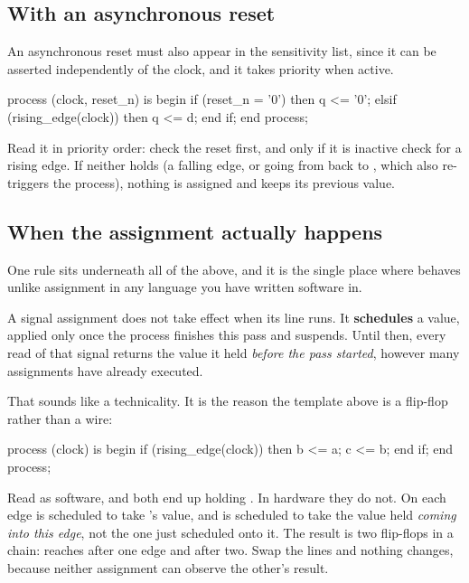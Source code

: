 \subsection{With an asynchronous reset}
\label{c3:asyncreset}
An asynchronous reset must also appear in the sensitivity list, since it can be asserted
independently of the clock, and it takes priority when active.

\begin{vhdlcode}
process (clock, reset_n) is
begin
    if (reset_n = '0') then
        q <= '0';
    elsif (rising_edge(clock)) then
        q <= d;
    end if;
end process;
\end{vhdlcode}

\noindent Read it in priority order: check the reset first, and only if it is inactive check for a
rising edge. If neither holds (a falling edge, or  going from  back to
, which also re-triggers the process), nothing is assigned and  keeps its previous
value.

\subsection{When the assignment actually happens}
\label{c3:scheduling}
One rule sits underneath all of the above, and it is the single place where \code{<=} behaves unlike
assignment in any language you have written software in.

A signal assignment does not take effect when its line runs. It \textbf{schedules} a value, applied
only once the process finishes this pass and suspends. Until then, every read of that signal returns
the value it held \emph{before the pass started}, however many assignments have already executed.

That sounds like a technicality. It is the reason the template above is a flip-flop rather than a
wire:

\begin{vhdlcode}
process (clock) is
begin
    if (rising_edge(clock)) then
        b <= a;
        c <= b;
    end if;
end process;
\end{vhdlcode}

\noindent Read as software,  and  both end up holding . In hardware they do
not. On each edge  is scheduled to take 's value, and  is scheduled to take
the value  held \emph{coming into this edge}, not the one just scheduled onto it. The result
is two flip-flops in a chain:  reaches  after one edge and  after two. Swap
the lines and nothing changes, because neither assignment can observe the other's result.

